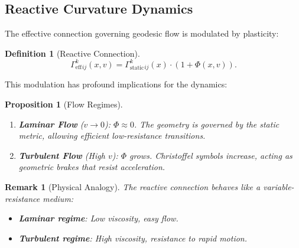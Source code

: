 \documentclass[12pt,letterpaper,twoside]{article}
\newtheorem{definition}{Definition}[section]
\newtheorem{remarque}{Remark}[section]
\newtheorem{prop}{Proposition}[section]
\begin{document}
\subsection{Reactive Curvature Dynamics}

The effective connection governing geodesic flow is modulated by plasticity:

\begin{definition}[Reactive Connection]
\[
\Gamma_{\text{eff}}^k{}_{ij}(x, v) = \Gamma_{\text{static}}^k{}_{ij}(x) \cdot \left(1 + \Phi(x, v)\right).
\]
\end{definition}

This modulation has profound implications for the dynamics:

\begin{prop}[Flow Regimes]
\begin{enumerate}
\item \textbf{Laminar Flow} ($v \to 0$): $\Phi \approx 0$. The geometry is governed by the static metric, allowing efficient low-resistance transitions.
\item \textbf{Turbulent Flow} (High $v$): $\Phi$ grows. Christoffel symbols increase, acting as geometric brakes that resist acceleration.
\end{enumerate}
\end{prop}

\begin{remarque}[Physical Analogy]
The reactive connection behaves like a variable-resistance medium:
\begin{itemize}
\item \textbf{Laminar regime}: Low viscosity, easy flow.
\item \textbf{Turbulent regime}: High viscosity, resistance to rapid motion.
\end{itemize}
\end{remarque}
\end{document}
